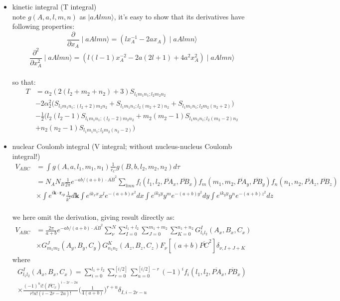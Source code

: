 \documentclass[11pt]{article}
\providecommand{\tightlist}{%
      \setlength{\itemsep}{0pt}\setlength{\parskip}{0pt}}
\begin{document}
    \begin{itemize}
\tightlist
\item
  kinetic integral (T integral)\\
  note \(g(A,a,l,m,n)\) as \(\mid aAlmn \rangle\), it's easy to show
  that its derivatives have following properties:\\
  \[\frac{\partial}{\partial x_A} \mid aAlmn \rangle = (lx_A^{-1}-2ax_A) \mid aAlmn \rangle\]
  \[\frac{\partial^2}{\partial x_A^2} \mid aAlmn \rangle = (l(l-1)x_A^{-2}-2a(2l+1)+4a^2x_A^2) \mid aAlmn \rangle \]\\
  so that: 
  \begin{align*}
  T &=
  \alpha_2 (2(l_2+m_2+n_2)+3)S_{l_1m_1n_1;l_2m_2n_2}
  \\ &-
  2\alpha_2^2 \big(S_{l_1m_1n_1;(l_2+2)m_2n_2} +
  S_{l_1m_1n_1;l_2(m_2+2)n_2} +
  S_{l_1m_1n_1;l_2m_2(n_2+2)}\big) 
  \\ &-
  \frac{1}{2}\big(l_2(l_2-1)S_{l_1m_1n_1;(l_2-2)m_2n_2} +
  m_2(m_2-1)S_{l_1m_1n_1;l_2(m_2-2)n_2} 
  \\ &+
  n_2(n_2-1)S_{l_1m_1n_1;l_2m_2(n_2-2)}\big)
  \end{align*}
\end{itemize}

    \begin{itemize}
\tightlist
\item
  nuclear Coulomb integral (V integral; without nucleus-nucleus Coulomb
  integral!)\\
  \begin{align*}
  V_{ABC} &= \int g(A,a,l_1,m_1,n_1)\frac{1}{r_C}g(B,b,l_2,m_2,n_2)d\tau
  \\
  &=N_AN_B \frac{1}{2\pi}e^{-ab/(a+b)\cdot \overline{AB}^2} \sum_{lmn} f_l(l_1,l_2,\overline{PA}_x, \overline{PB}_x) f_m(m_1,m_2,\overline{PA}_y, \overline{PB}_y) f_n(n_1,n_2,\overline{PA}_z, \overline{PB}_z)
  \\
  &\times \int e^{i\mathbf{k}\cdot \mathbf{r}_{cp}} \frac{1}{k^2}d\mathbf{k} \int e^{ik_x x}x^l e^{-(a+b)x^2} dx \int e^{ik_y y}y^m e^{-(a+b)y^2} dy \int e^{ik_y y}y^n e^{-(a+b)z^2} dz
  \end{align*}
  \\
  we here omit the derivation, giving result directly as:\\
  \begin{align*}
  V_{ABC} &= 
  \frac{2\pi}{a+b}e^{-ab/(a+b)\cdot\overline{AB}^2} \sum_{\nu}^{N}\sum_{I=0}^{l_1+l_2}
  \sum_{J=0}^{m_1+m_2}\sum_{K=0}^{n_1+n_2} 
  G_{l_1l_2}^{I}(A_x,B_x,C_x)
  \\
  &\times G_{m_1m_2}^{J}(A_y,B_y,C_y) G_{n_1n_2}^{K}(A_z,B_z,C_z)
  F_{\nu}[(a+b)\overline{PC}^2]\delta_{\nu,I+J+K}
   \end{align*} 
  where 
  \begin{align*}
  G_{l_1l_2}^{I}(A_x,B_x,C_x) = \sum_{i=0}^{l_1+l_2}\sum_{r=0}^{[i/2]} \sum_{u=0}^{[i/2]-r} (-1)^i f_i (l_1,l_2,\overline{PA}_x,\overline{PB}_x)
  \\ \times
  \frac{(-1)^u i!(\overline{PC}_x)^{i-2r-2u}}{r!u!(i-2r-2u)!} \big(\frac{1}{4(a+b)}\big)^{r+u} \delta_{I,i-2r-u}
   \end{align*}
\end{itemize}
\end{document}
